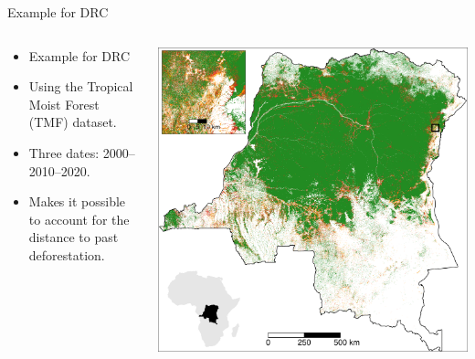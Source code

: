 \documentclass[10pt,table,dvipsnames,compress]{beamer}
\begin{document}
\begin{frame}[label={sec:org90c4f1a}]{Example for DRC}
\begin{columns}
\begin{column}{0.5\columnwidth}
\begin{itemize}
\item Example for DRC
\item Using the Tropical Moist Forest (TMF) dataset.
\item Three dates: 2000--2010--2020.
\item Makes it possible to account for the distance to past deforestation.
\end{itemize}
\end{column}

\begin{column}{0.5\columnwidth}
\includegraphics[width=\textwidth]{figs/sm/fcc123}

\end{column}
\end{columns}
\end{frame}
\end{document}
